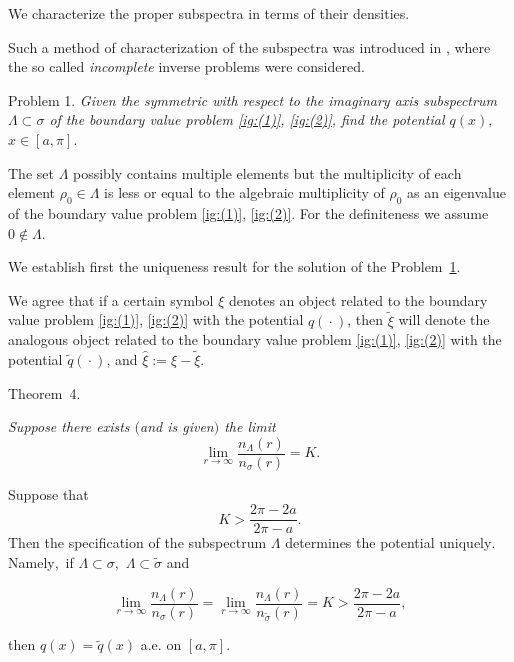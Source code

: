 We characterize the proper subspectra in terms of their densities. 

Such a method of characterization of the subspectra was introduced in \cite{ign:15}, where  the so called {\it incomplete} inverse problems were considered.



\smallskip



\hypertarget{ign:problem1}{}



{\small \sc Problem 1.} {\it Given the symmetric with respect to the imaginary axis subspectrum $\Lambda\subset\sigma$ of the boundary value problem {\rm \eqref{ig:(1)}, \eqref{ig:(2)}, } find the potential $q(x),$ $ x\in[a,\pi].$}





\smallskip



The set $\Lambda$ possibly contains multiple elements but the multiplicity of each element $\rho_0\in\Lambda$ is less or equal to the algebraic multiplicity of $\rho_0$ as an eigenvalue of the boundary value problem \eqref{ig:(1)}, \eqref{ig:(2)}. For the definiteness we assume $0\notin\Lambda$.



We establish first the uniqueness result for the solution of the Problem~\hyperlink{ign:problem1}{1}.

We agree that if a certain symbol $\xi$ denotes an object related to the boundary value problem \eqref{ig:(1)}, \eqref{ig:(2)} with the potential $q({}\cdot{})$, then $\tilde\xi$ will denote the analogous object related to the boundary value problem \eqref{ig:(1)}, \eqref{ig:(2)}  with the potential $\tilde q({}\cdot{})$, and $\hat\xi:=\xi-\tilde\xi$.





\smallskip



\hypertarget{ign:th4}{}



{\small \sc Theorem~4.} {\it Suppose there exists $($and is given\/$)$ the limit $$ \lim\limits_{r\to\infty} \frac{n_{\Lambda}(r)}{n_{\sigma}(r)}=K.$$

Suppose that $$K>\frac{2\pi-2a}{2\pi-a}.$$ Then the specification of the subspectrum $\Lambda$ determines the potential uniquely$.$ Namely$,$ if $\Lambda\subset\sigma,$ $\Lambda\subset\tilde\sigma$ and

$$

\lim\limits_{r\to\infty} \frac{n_{\Lambda}(r)}{n_{\sigma}(r)}=\lim\limits_{r\to\infty} \frac{n_{\Lambda}(r)}{n_{\tilde\sigma}(r)}=

K>\frac{2\pi-2a}{2\pi-a},

$$

then $q(x)=\tilde q(x)$ a$.$e$.$ on $[a,\pi].$

}



